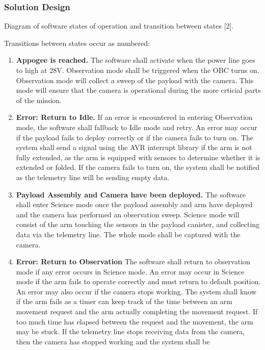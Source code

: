 \documentclass[letterpaper,10pt]{article}
\begin{document}
\subsubsection{Solution Design}

\begin{center}
Diagram of software states of operation and transition between states [2].

Transitions between states occur as numbered:

\begin{enumerate}
\item{\textbf{Appogee is reached.} The software shall activate when the power line goes to high at 28V. Observation mode shall be 
triggered when the \gls{OBC} turns on. Observation mode will collect a sweep of the payload with the camera. This mode will ensure that the 
camera is operational during the more crticial parts of the mission.}
\item{\textbf{Error: Return to Idle.} If an error is encountered in entering Observation mode, the software shall fallback to Idle 
mode and retry. An error may occur if the payload fails to deploy correctly or if the camera fails to turn on. The system shall send
a signal using the AVR interrupt library if the arm is not fully extended, as the arm is equipped with sensors to determine whether
it is extended or folded. If the camera fails to turn on, the system shall be notified as the telemetry line will be sending empty
data.}
\item{\textbf{Payload Assembly and Camera have been deployed.} The software shall enter Science mode once the payload assembly and arm
 have deployed and the camera has performed an observation sweep. Science mode will consist of the arm touching the sensors in 
 the payload canister, and collecting data via the telemetry line. The whole mode shall be captured with the camera.}
\item{\textbf{Error: Return to Observation} The software shall return to observation mode if any error occurs in Science mode. An error may occur in Science mode if the arm fails to operate correctly and must return to default position. An error may also occur if the camera stops working. The system shall know if the arm fails as a timer can keep track of the time between an arm movement request
and the arm actually completing the movement request. If too much time has elapsed between the request and the movement, the arm may
be stuck. If the telemetry line stops receiving data from the camera, then the camera has stopped working and the system shall be 
}
\end{enumerate}
\end{center}
\end{document}
